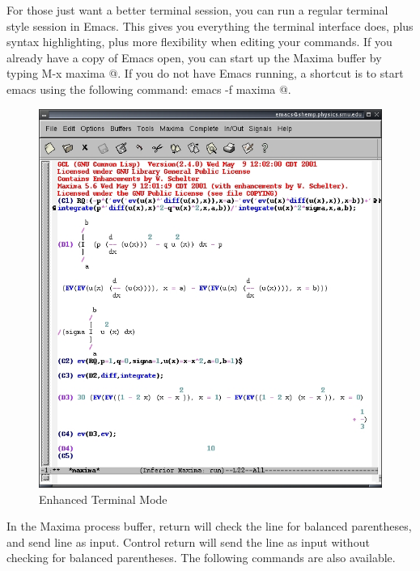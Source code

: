 For those just want a better terminal session, you can run a regular terminal
style session in Emacs.  This gives you everything the 
terminal interface does, plus syntax highlighting, plus more flexibility when
editing your commands.  If you already have a copy of Emacs open, you can start
up the Maxima buffer by typing \verb@ M-x maxima @.  If you do not have Emacs
running, a shortcut is to start emacs using the following command: \verb@ emacs -f maxima @.  

\begin{figure}
\centering \includegraphics{images/emacsshot}
\caption{Enhanced Terminal Mode}
\end{figure}

In the Maxima process buffer,
return will check the line for balanced parentheses, and send line as input.
Control return will send the line as input without checking for balanced
parentheses.  The following commands are also available.

\smallskip

